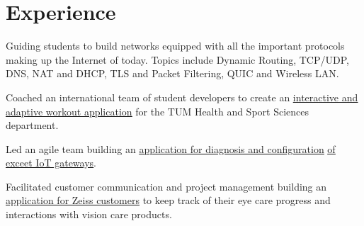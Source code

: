 \documentclass[]{cv}
\begin{document}
%
%


%
%

\begin{minipage}[t]{0.70\textwidth} 



\section{Experience}

\vspace{\topsep}
\begin{tightemize}
\sectionsep
\item Guiding students to build networks equipped with all the important protocols making up the Internet of today. Topics include Dynamic Routing, TCP/UDP, DNS, NAT and DHCP, TLS and Packet Filtering, QUIC and Wireless LAN.
\end{tightemize}
\sectionsep

\begin{tightemize}
\sectionsep
\item Coached an international team of student developers to create an \href{https://ase.in.tum.de/lehrstuhl_1/images/ipraktikum/ss20/Poster_SS20_Sport.png}{\underline{interactive and adaptive workout application}} for the TUM Health and Sport Sciences department.
\item Led an agile team building an \href{https://ase.in.tum.de/lehrstuhl_1/images/ipraktikum/ws2021/Poster_WS2021_exceet.png}{\underline{application for diagnosis and configuration}} \href{https://ase.in.tum.de/lehrstuhl_1/images/ipraktikum/ws2021/Poster_WS2021_exceet.png}{\underline{of exceet IoT gateways}}.
\item Facilitated customer communication and project management building an \href{https://ase.in.tum.de/lehrstuhl_1/images/ipraktikum/ss21/Poster_SS21_Zeiss.png}{\underline{application for Zeiss customers}} to keep track of their eye care progress and interactions with vision care products.  
\end{tightemize}
\sectionsep


\end{minipage}
\end{document}
